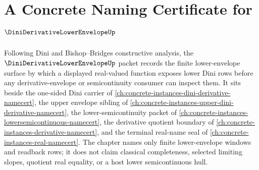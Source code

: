 \chapter{A Concrete Naming Certificate for $\DiniDerivativeLowerEnvelopeUp$}
\label{ch:concrete-instances-dini-derivative-lower-envelope-namecert}

Following Dini and Bishop--Bridges constructive analysis, the $\DiniDerivativeLowerEnvelopeUp$ packet records the finite lower-envelope surface by which a displayed real-valued function exposes lower Dini rows before any derivative-envelope or semicontinuity consumer can inspect them. It sits beside the one-sided Dini carrier of \autoref{ch:concrete-instances-dini-derivative-namecert}, the upper envelope sibling of \autoref{ch:concrete-instances-upper-dini-derivative-namecert}, the lower-semicontinuity packet of \autoref{ch:concrete-instances-lowersemicontinuous-namecert}, the derivative quotient boundary of \autoref{ch:concrete-instances-derivative-namecert}, and the terminal real-name seal of \autoref{ch:concrete-instances-real-namecert}. The chapter names only finite lower-envelope windows and readback rows; it does not claim classical completeness, selected limiting slopes, quotient real equality, or a host lower semicontinuous hull.


